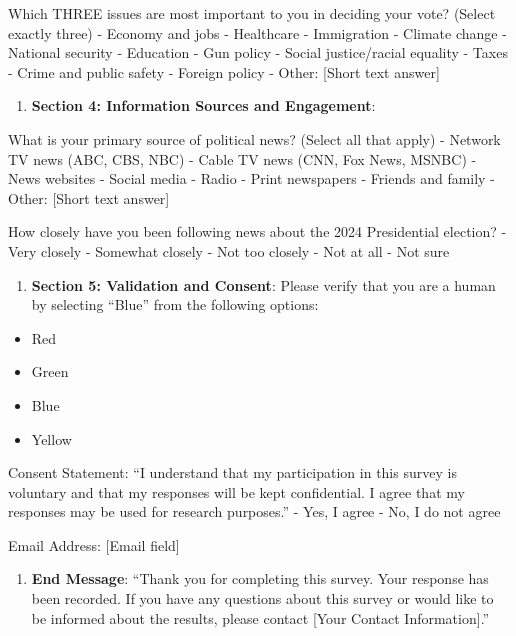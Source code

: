 \documentclass[
  letterpaper,
  DIV=11,
  numbers=noendperiod]{scrartcl}
\providecommand{\tightlist}{%
  \setlength{\itemsep}{0pt}\setlength{\parskip}{0pt}}\usepackage{longtable,booktabs,array}
\begin{document}
Which THREE issues are most important to you in deciding your vote?
(Select exactly three) - Economy and jobs - Healthcare - Immigration -
Climate change - National security - Education - Gun policy - Social
justice/racial equality - Taxes - Crime and public safety - Foreign
policy - Other: {[}Short text answer{]}

\begin{enumerate}
\def\labelenumi{\arabic{enumi}.}
\setcounter{enumi}{4}
\tightlist
\item
  \textbf{Section 4: Information Sources and Engagement}:
\end{enumerate}

What is your primary source of political news? (Select all that apply) -
Network TV news (ABC, CBS, NBC) - Cable TV news (CNN, Fox News, MSNBC) -
News websites - Social media - Radio - Print newspapers - Friends and
family - Other: {[}Short text answer{]}

How closely have you been following news about the 2024 Presidential
election? - Very closely - Somewhat closely - Not too closely - Not at
all - Not sure

\begin{enumerate}
\def\labelenumi{\arabic{enumi}.}
\setcounter{enumi}{5}
\tightlist
\item
  \textbf{Section 5: Validation and Consent}: Please verify that you are
  a human by selecting ``Blue'' from the following options:
\end{enumerate}

\begin{itemize}
\tightlist
\item
  Red
\item
  Green
\item
  Blue
\item
  Yellow
\end{itemize}

Consent Statement: ``I understand that my participation in this survey
is voluntary and that my responses will be kept confidential. I agree
that my responses may be used for research purposes.'' - Yes, I agree -
No, I do not agree

Email Address: {[}Email field{]}

\begin{enumerate}
\def\labelenumi{\arabic{enumi}.}
\setcounter{enumi}{6}
\tightlist
\item
  \textbf{End Message}: ``Thank you for completing this survey. Your
  response has been recorded. If you have any questions about this
  survey or would like to be informed about the results, please contact
  {[}Your Contact Information{]}.''
\end{enumerate}
\end{document}
